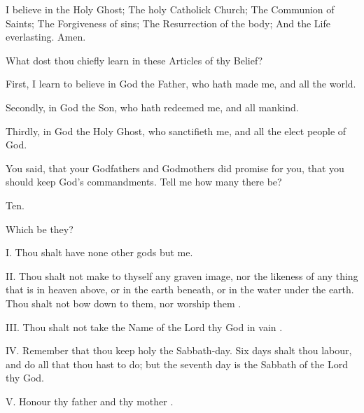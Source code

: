 I believe in the Holy Ghost; The holy Catholick Church; The Communion of Saints; The Forgiveness of sins; The Resurrection of the body; And the Life everlasting. Amen.

\centerline{}
What dost thou chiefly learn in these Articles of thy Belief?

 First, I learn to believe in God the Father, who hath made me, and all the world.

Secondly, in God the Son, who hath redeemed me, and all mankind.

Thirdly, in God the Holy Ghost, who sanctifieth me, and all the elect people of God.

\medskip
\centerline{}
You said, that your Godfathers and Godmothers did promise for you, that you should keep God’s commandments. Tell me how many there be?

 Ten.

 Which be they?

\centerline{}

I. Thou shalt have none other gods but me.

II. Thou shalt not make to thyself any graven image, nor the likeness of any thing that is in heaven above, or in the earth beneath, or in the water under the earth. Thou shalt not bow down to them, nor worship them%
.

III. Thou shalt not take the Name of the Lord thy God in vain%
.

IV. Remember that thou keep holy the Sabbath-day. Six days shalt thou labour, and do all that thou hast to do; but the seventh day is the Sabbath of the Lord thy God. %

V. Honour thy father and thy mother%
.

